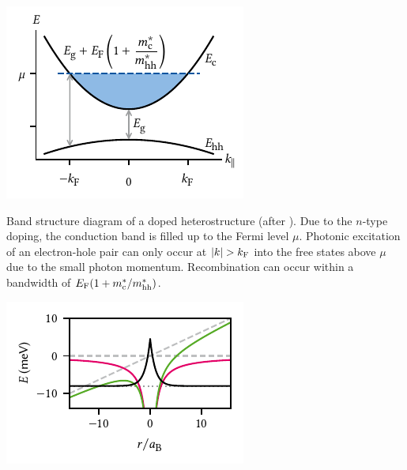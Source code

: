 \clearpage

\begin{marginfigure}
    \centering
    \includegraphics{img/pdf/experiment/2deg_sketch}
    \caption[]{
        Band structure diagram of a doped heterostructure (after ).
        Due to the $n$-type doping, the conduction band is filled up to the Fermi level $\mu$.
        Photonic excitation of an electron-hole pair can only occur at $\abs{k} > k_{\mathrm{F}}$ into the free states above $\mu$ due to the small photon momentum.
        Recombination can occur within a bandwidth of $E_{\mathrm{F}}(1 + m^\ast_{\mathrm{c}}/m^\ast_{\mathrm{hh}})$.
    }
    \label{fig:exp:theory:bandstructure}
\end{marginfigure}

\begin{marginfigure}
    \centering
    \includegraphics{img/pdf/experiment/in_plane_field}
    \caption[]{
        Effect of an in-plane electric field on an exciton wavefunction.
        In the hole's reference frame, the electron sees a static attractive Coulomb potential (magenta), resulting in a bound state (dotted gray line, wave function sketched in black).
        Applying an electric field ($F=\qty{100}{\milli\volt\per\micro\meter}$, dashed gray lines) tilts the Coulomb potential (green) and leads to a transparent barrier through which the electron can tunnel out.
    }
    \label{fig:exp:theory:in_plane_field}
\end{marginfigure}

